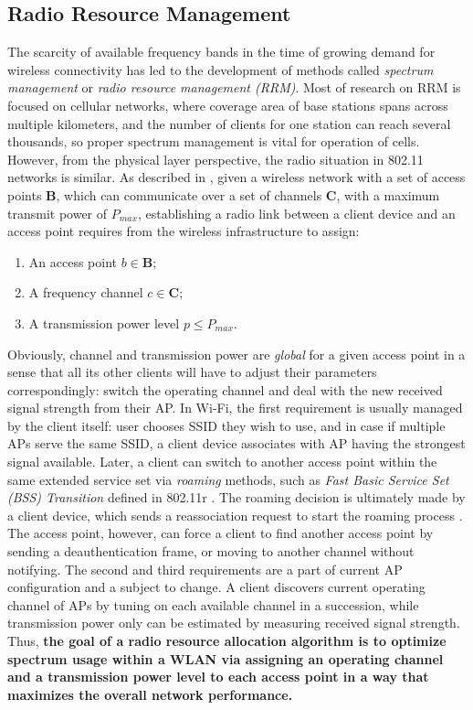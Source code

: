 \subsection{Radio Resource Management}
\label{chap:intro:sec:rrm}
The scarcity of available frequency bands in the time of growing demand for wireless connectivity has led to the development of methods called \textit{spectrum management} or \textit{radio resource management (RRM)}. Most of research on RRM is focused on cellular networks, where coverage area of base stations spans across multiple kilometers, and the number of clients for one station can reach several thousands, so proper spectrum management is vital for operation of cells. However, from the physical layer perspective, the radio situation in 802.11 networks is similar. As described in \cite{zanderRadioResourceManagement1997}, given a wireless network with a set of access points $\boldsymbol{B}$, which can communicate over a set of channels $\boldsymbol{C}$, with a maximum transmit power of $P_{max}$, establishing a radio link between a client device and an access point requires from the wireless infrastructure to assign:
\begin{enumerate}
    \item An access point $b \in \boldsymbol{B}$;
    \item A frequency channel $c \in \boldsymbol{C}$;
    \item A transmission power level $ p \leq P_{max}$.
\end{enumerate}
Obviously, channel and transmission power are \textit{global} for a given access point in a sense that all its other clients will have to adjust their parameters correspondingly: switch the operating channel and deal with the new received signal strength from their AP.
In Wi-Fi, the first requirement is usually managed by the client itself: user chooses SSID they wish to use, and in case if multiple APs serve the same SSID, a client device associates with AP having the strongest signal available. Later, a client can switch to another access point within the same extended service set via \textit{roaming} methods, such as \textit{Fast Basic Service Set (BSS) Transition} defined in 802.11r \cite{80211r2008IEEE}. The roaming decision is ultimately made by a client device, which sends a reassociation request to start the roaming process \cite{colemanCWNACertifiedWireless2021}. The access point, however, can force a client to find another access point by sending a deauthentication frame, or moving to another channel without notifying.
The second and third requirements are a part of current AP configuration and a subject to change. A client discovers current operating channel of APs by tuning on each available channel in a succession, while transmission power only can be estimated by measuring received signal strength.
Thus, \textbf{the goal of a radio resource allocation algorithm is to optimize spectrum usage within a WLAN via assigning an operating channel and a transmission power level to each access point in a way that maximizes the overall network performance.}

